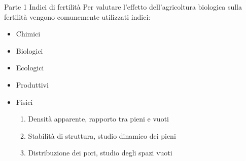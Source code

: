 \documentclass[xcolor={usenames, table, x11names}, final, 10pt]{beamer}
\begin{document}
\begin{frame}{Parte 1 \small{Indici di fertilità}}
  Per valutare l'effetto dell'agricoltura biologica sulla fertilità
  vengono comunemente utilizzati indici:
  \begin{itemize}[<+->]
    \pause
  \item Chimici
  \item Biologici
  \item Ecologici
  \item Produttivi
  \item \LARGE Fisici

    \begin{enumerate}[<+->]

    \item  \large{Densità apparente}, \normalsize{rapporto tra pieni e vuoti}
      \vfill
    \item  \large{Stabilità di struttura}, \normalsize{studio dinamico dei pieni}
      \vfill
    \item  \large{Distribuzione dei pori}, \normalsize{studio degli spazi vuoti}
    \end{enumerate}
  \end{itemize}
  
\end{frame}
\end{document}
